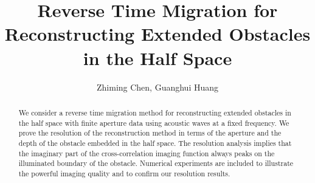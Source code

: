 \documentclass[11pt]{iopart}
\begin{document}
\def\debproof{\noindent {\bf Proof.} }
\def\finproof{\hfill {\small $\Box$} \\}
\renewcommand{\theequation}
{\arabic{section}.\arabic{equation}}


\title[RTM in the Half Space]{Reverse Time Migration for Reconstructing Extended Obstacles in the Half Space}

\author{ Zhiming Chen,
Guanghui Huang }

\address{LSEC, Institute of Computational Mathematics, Academy of
Mathematics and Systems Science, Chinese Academy of Sciences,
Beijing 100190, China}

\begin{abstract}
We consider a reverse time migration method for reconstructing extended obstacles in the half space with finite aperture data using acoustic waves at a fixed frequency. We prove the resolution of the reconstruction method in terms of the aperture and the depth of the obstacle embedded in the half space. The resolution analysis implies that the imaginary part of the cross-correlation imaging function always peaks on the illuminated boundary of the obstacle. Numerical experiments are included to illustrate the powerful imaging quality and to confirm our resolution results.
\end{abstract}
\maketitle

\newcommand{\RR}{\mathcal{R}}
\newtheorem{lem}{Lemma}[section]
\newtheorem{prop}{Proposition}[section]
\newtheorem{cor}{Corollary}[section]
\newtheorem{thm}{Theorem}[section]
\newtheorem{rem}{Remark}[section]
\newtheorem{alg}{Algorithm}[section]
\newtheorem{assum}{Assumption}[section]
\newtheorem{definition}{Definition}[section]
\newtheorem{exmp}{Example}[section]
\newtheorem{fig}{Figure}[section]
\end{document}

